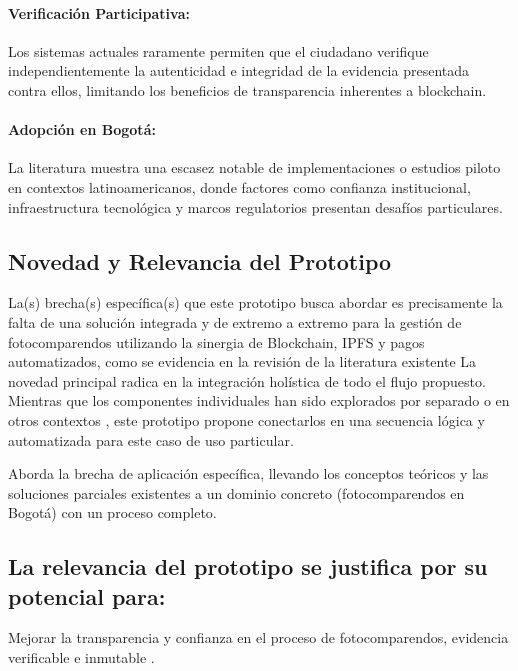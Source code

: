 \paragraph{Verificación Participativa:}
Los sistemas actuales raramente permiten que el ciudadano verifique independientemente la autenticidad e integridad de la evidencia presentada contra ellos, limitando los beneficios de transparencia inherentes a blockchain. 

\paragraph{Adopción en Bogotá:}
 La literatura muestra una escasez notable de implementaciones o estudios piloto en contextos latinoamericanos, donde factores como confianza institucional, infraestructura tecnológica y marcos regulatorios presentan desafíos particulares. \parencite{choquevilca2024blockchain, rezabala2025blockchain}

\subsection{Novedad y Relevancia del Prototipo} 
La(s) brecha(s) específica(s) que este prototipo busca abordar es precisamente la falta de una solución integrada y de extremo a extremo para la gestión de fotocomparendos utilizando la sinergia de Blockchain, IPFS y pagos automatizados, como se evidencia en la revisión de la literatura existente \parencite{yousfi2022its,AnandSingh_ProjectReport_Year}
La novedad principal radica en la integración holística de todo el flujo propuesto. Mientras que los componentes individuales han sido explorados por separado \parencite{adel2023decentralized,mishra2024integration} o en otros contextos \parencite{mani2023smart,dutta2023solution}, este prototipo propone conectarlos en una secuencia lógica y automatizada para este caso de uso particular. 

Aborda la brecha de aplicación específica, llevando los conceptos teóricos \parencite{swan2015blockchain, antonopoulos2023mastering} y las soluciones parciales existentes \parencite{choquevilca2024blockchain} a un dominio concreto (fotocomparendos en Bogotá) con un proceso completo. 

\subsection{La relevancia del prototipo se justifica por su potencial para:} 
Mejorar la transparencia y confianza en el proceso de fotocomparendos, evidencia verificable e inmutable \parencite{meroni2023editorial,thanasas2025enhancing}. 

